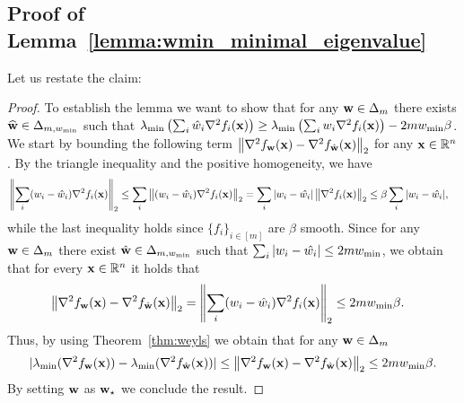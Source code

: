 \subsection{Proof of Lemma~\ref{lemma:wmin_minimal_eigenvalue}}
Let us restate the claim:
\ContOfMinEigenOfHessian*

\begin{proof}
        To establish the lemma we want to show that for any ${\mathbf{w}}\in \Delta_{m}$ there exists $\widehat{{\mathbf{w}}}\in \Delta_{m,{w_{\min}}}$ such that $\lambda_{\min} \left(\sum_{i} \hat{w}_i \nabla^2 f_i({\mathbf{x}})\right)\geq \lambda_{\min} \left(\sum_{i} w_i \nabla^2 f_i({\mathbf{x}})\right)-2m{w_{\min}}\beta$. We start by bounding the following term $\left\Vert\nabla^2 f_{\mathbf{w}}({\mathbf{x}}) - \nabla^2 f_{\hat{{\mathbf{w}}}}({\mathbf{x}})\right\Vert_2$ for any ${\mathbf{x}}\in \mathbb{R}^n$. By the triangle inequality and the positive homogeneity, we have 
    \begin{align*}
       &\left\Vert\sum_i(w_i-\hat{w}_i)\nabla^2 f_i({\mathbf{x}})\right\Vert_2 \leq  \sum_i \left\Vert(w_i-\hat{w}_i) \nabla^2 f_i({\mathbf{x}})\right\Vert_2 = \sum_i |w_i-\hat{w_i}|\left\Vert \nabla^2 f_i({\mathbf{x}})\right\Vert_2  \leq \beta \sum_i |w_i-\hat{w_i}|,
    \end{align*}
    while the last inequality holds since $\{f_i\}_{i\in[m]}$ are $\beta$ smooth. Since for any ${\mathbf{w}}\in \Delta_m$ there exist $\hat{{\mathbf{w}}}\in \Delta_{m,{w_{\min}}}$ such that $\sum_i |w_i-\hat{w_i}| \leq 2m{w_{\min}}$, we obtain that for every ${\mathbf{x}}\in\mathbb{R}^n$ it holds that 
    \begin{align*}
       &\left\Vert\nabla^2 f_{\mathbf{w}}({\mathbf{x}}) - \nabla^2 f_{\hat{{\mathbf{w}}}}({\mathbf{x}})\right\Vert_2 = \left\Vert\sum_i(w_i-\hat{w}_i)\nabla^2 f_i({\mathbf{x}})\right\Vert_2 \leq  2m{w_{\min}}\beta.
    \end{align*}
    Thus, by using Theorem~\ref{thm:weyls} we obtain that for any ${\mathbf{w}}\in \Delta_m$
    \begin{align*}
         | \lambda_{\min} (\nabla^2 f_{\mathbf{w}}({\mathbf{x}})) - \lambda_{\min} (\nabla^2 f_{\hat{{\mathbf{w}}}}({\mathbf{x}})) | \leq \left\Vert\nabla^2 f_{\mathbf{w}}({\mathbf{x}}) - \nabla^2 f_{\hat{{\mathbf{w}}}}({\mathbf{x}})\right\Vert_2 \leq  2m{w_{\min}}\beta.
    \end{align*}
    By setting ${\mathbf{w}}$ as ${\mathbf{w}}_\star$ we conclude the result.
\end{proof}








